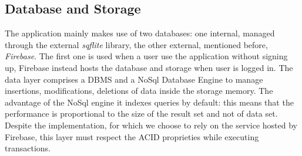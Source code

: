 \subsection{Database and Storage}
The application mainly makes use of two databases: one internal, managed through the external \textit{sqflite} library, the other external, mentioned before, \textit{Firebase}.
The first one is used when a user use the application without signing up, Firebase instead hosts the database and storage when user is logged in.
The data layer comprises a DBMS and a NoSql Database Engine to manage insertions, modifications, deletions of data inside the storage memory. The advantage of the NoSql engine it indexes queries by default: this means that the performance is proportional to the size of the result set and not of data set. Despite the implementation, for which we choose to rely on the service hosted by Firebase, this layer must respect the ACID proprieties while executing transactions.